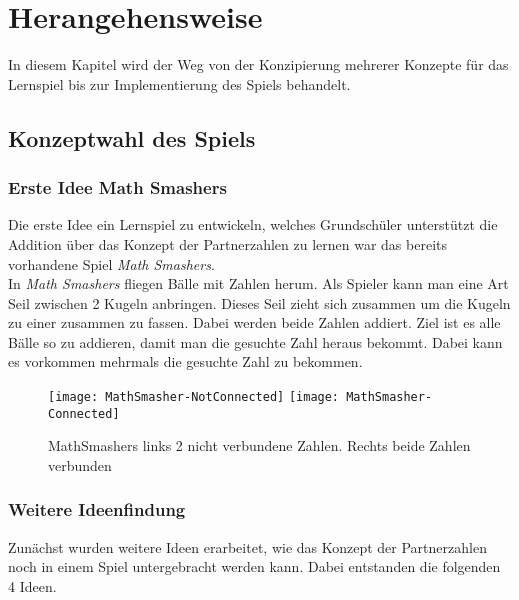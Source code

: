 %
\chapter{Herangehensweise}
In diesem Kapitel wird der Weg von der Konzipierung mehrerer Konzepte für das Lernspiel bis zur Implementierung des Spiels behandelt.
\section{Konzeptwahl des Spiels}
\subsection{Erste Idee Math Smashers}
Die erste Idee ein Lernspiel zu entwickeln, welches Grundschüler unterstützt die Addition über das Konzept der Partnerzahlen zu lernen war das bereits vorhandene Spiel \textit{Math Smashers}.\\
In \textit{Math Smashers} fliegen Bälle mit Zahlen herum. Als Spieler kann man eine Art Seil zwischen 2 Kugeln anbringen. Dieses Seil zieht sich zusammen um die Kugeln zu einer zusammen zu fassen. Dabei werden beide Zahlen addiert. Ziel ist es alle Bälle so zu addieren, damit man die gesuchte Zahl heraus bekommt. Dabei kann es vorkommen mehrmals die gesuchte Zahl zu bekommen.
\begin{figure}[htb]
	\centering
	\texttt{[image: MathSmasher-NotConnected]}
	\texttt{[image: MathSmasher-Connected]}
	\caption{MathSmashers links 2 nicht verbundene Zahlen. Rechts beide Zahlen verbunden\label{fig:mathsmashers}}
\end{figure}
\subsection{Weitere Ideenfindung}
Zunächst wurden weitere Ideen erarbeitet, wie das Konzept der Partnerzahlen noch in einem Spiel untergebracht werden kann. Dabei entstanden die folgenden 4 Ideen.

